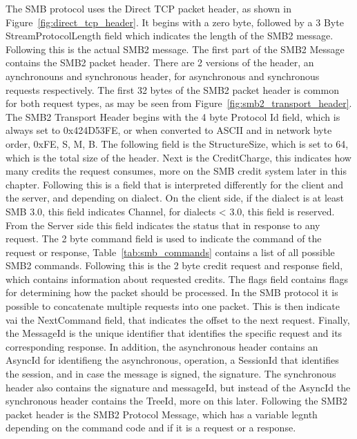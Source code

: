 \documentclass[english, 12pt, a4paper, elec, utf8, a-2b, online]{aaltothesis}
\begin{document}
The SMB protocol uses the Direct TCP packet header, as shown in Figure~\ref{fig:direct_tcp_header}.
It begins with a zero byte, followed by a 3 Byte StreamProtocolLength field which
indicates the length of the SMB2 message. Following this is the actual SMB2 message.
The first part of the SMB2 Message contains the SMB2 packet header. There are 2 versions
of the header, an aynchronouns and synchronous header, for asynchronous and synchronous
requests respectively. The first 32 bytes of the SMB2 packet header is common for both
request types, as may be seen from Figure~\ref{fig:smb2_transport_header}. The SMB2 Transport
Header begins with the 4 byte Protocol Id field, which is always set to 0x424D53FE,
or when converted to ASCII and in network byte order, 0xFE, S, M, B. The following field
is the StructureSize, which is set to 64, which is the total size of the header. Next
is the CreditCharge, this indicates how many credits the request consumes, more on
the SMB credit system later in this chapter. Following this is a field that is 
interpreted differently for the client and the server, and depending on dialect.
On the client side, if the dialect is at least SMB 3.0, this field indicates Channel,
for dialects < 3.0, this field is reserved. From the Server side this field indicates
the status that in response to any request. The 2 byte command field is used to 
indicate the command of the request or response, Table~\ref{tab:smb_commands} contains
a list of all possible SMB2 commands. Following this is the 2 byte credit request and
response field, which contains information about requested credits. The flags field
contains flags for determining how the packet should be processed. In the SMB
protocol it is possible to concatenate multiple requests into one packet. This is then
indicate vai the NextCommand field, that indicates the offset to the next request.
Finally, the MessageId is the unique identifier that identifies the specific
request and its corresponding response. In addition, the asynchronous header contains an AsyncId for identifieng the asynchronous,
operation, a SessionId that identifies the session, and in case the message is signed,
the signature. The synchronous header also contains the signature and messageId, but instead
of the AsyncId the synchronous header contains the TreeId, more on this later. Following
the SMB2 packet header is the SMB2 Protocol Message, which has a variable legnth depending
on the command code and if it is a request or a response\cite{smb2_tech}.
\end{document}
